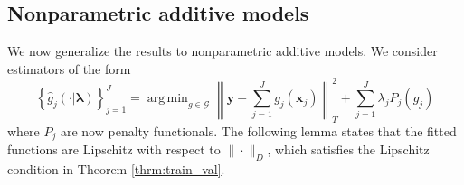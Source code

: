 \documentclass[12pt]{article}
\newtheorem{lemma}{Lemma}
\newtheorem{definition}{Definition}
\newtheorem{condition}{Condition}
\DeclareMathOperator*{\argmin}{arg\,min}
\begin{document}
%
%
%


\subsection{Nonparametric additive models}
\label{sec:smoothness_validation}

We now generalize the results to nonparametric additive models. We consider estimators of the form
\begin{equation}
\label{eq:train_crit_nonparam}
\left\{ \hat{g}_j(\cdot | \boldsymbol \lambda) \right \}_{j=1}^J = 
\argmin_{g\in \mathcal{G}} 
\left \| \boldsymbol y -  \sum_{j=1}^J g_j(\boldsymbol x_j) \right \|^2_T 
+ \sum_{j=1}^J \lambda_j P_j(g_j)
\end{equation}
where $P_j$ are now penalty functionals. The following lemma states that the fitted functions are Lipschitz with respect to $\| \cdot \|_D$, which satisfies the Lipschitz condition in Theorem \ref{thrm:train_val}.

\end{document}
